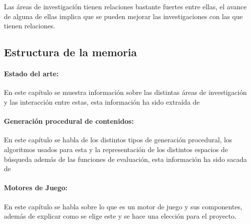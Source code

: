 Las áreas de investigación tienen relaciones bastante fuertes entre ellas, el avance de alguna de ellas implica que se pueden mejorar las investigaciones con las que tienen relaciones.


%
%
\subsection*{Estructura de la memoria}

\paragraph*{Estado del arte:}
En este capítulo se muestra información sobre las distintas áreas de investigación y las interacción entre estas, esta información ha sido extraída de \cite{B1}

\paragraph*{Generación procedural de contenidos:}
En este capítulo se habla de los distintos tipos de generación procedural, los algoritmos usados para esta y la representación de los distintos espacios de búsqueda además de las funciones de evaluación, esta información ha sido sacada de \cite{B1}\cite{B2}\cite{B3}\cite{B4}\cite{B5}\cite{B6}\cite{B7}\cite{B8}

\paragraph*{Motores de Juego:}
En este capítulo se habla sobre lo que es un motor de juego y sus componentes, además de explicar como se elige este y se hace una elección para el proyecto.
